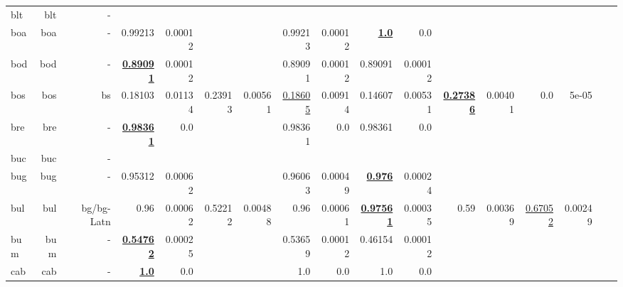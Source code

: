 \documentclass[11pt]{article}
\begin{document}
\begin{table*}[h]
{\begin{tabular}{lrrrrrrrrrrrrrrrr}
blt         & blt         & -         &          &          &          &          &          &          &          &          &          &          &          &          \\
boa         & boa         & -         & 0.99213         & 0.00012         &          &          & 0.99213         & 0.00012         & \textbf{\underline{1.0}}         & 0.0         &          &          &          &          \\
bod         & bod         & -         & \textbf{\underline{0.89091}}         & 0.00012         &          &          & 0.89091         & 0.00012         & 0.89091         & 0.00012         &          &          &          &          \\
bos         & bos         & bs         & 0.18103         & 0.01134         & 0.23913         & 0.00561         & \underline{0.18605}         & 0.00914         & 0.14607         & 0.00531         & \textbf{\underline{0.27386}}         & 0.00401         & 0.0         & 5e-05         \\
bre         & bre         & -         & \textbf{\underline{0.98361}}         & 0.0         &          &          & 0.98361         & 0.0         & 0.98361         & 0.0         &          &          &          &          \\
buc         & buc         & -         &          &          &          &          &          &          &          &          &          &          &          &          \\
bug         & bug         & -         & 0.95312         & 0.00062         &          &          & 0.96063         & 0.00049         & \textbf{\underline{0.976}}         & 0.00024         &          &          &          &          \\
bul         & bul         & bg/bg-Latn         & 0.96         & 0.00062         & 0.52212         & 0.00488         & 0.96         & 0.00061         & \textbf{\underline{0.97561}}         & 0.00035         & 0.59         & 0.00369         & \underline{0.67052}         & 0.00249         \\
bum         & bum         & -         & \textbf{\underline{0.54762}}         & 0.00025         &          &          & 0.53659         & 0.00012         & 0.46154         & 0.00012         &          &          &          &          \\
cab         & cab         & -         & \textbf{\underline{1.0}}         & 0.0         &          &          & 1.0         & 0.0         & 1.0         & 0.0         &          &          &          &          \\

\end{tabular}}
\end{table*}
\end{document}
